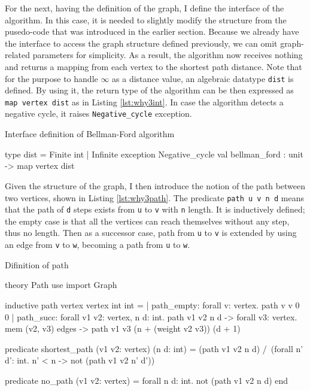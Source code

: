 \documentclass[a4paper,12pt]{article}
\begin{document}
For the next, having the definition of the graph, I define the
interface of the algorithm. In this case, it is needed to slightly
modify the structure from the pusedo-code that was introduced in the
earlier section. Because we already have the interface to access the
graph structure defined previously, we can omit graph-related
parameters for simplicity. As a result, the algorithm now receives
nothing and returns a mapping from each vertex to the shortest path
distance. Note that for the purpose to handle $\infty$ as a distance
value, an algebraic datatype \texttt{dist} is defined. By using it,
the return type of the algorithm can be then expressed as \texttt{map
  vertex dist} as in Listing \ref{lst:why3int}. In case the algorithm
detects a negative cycle, it raises \texttt{Negative\_cycle}
exception.

\begin{algorithm}
\caption{Interface definition of Bellman-Ford algorithm}\label{lst:why3int}
\begin{why3}
type dist = Finite int | Infinite
exception Negative_cycle
val bellman_ford : unit -> map vertex dist
\end{why3}
\end{algorithm}

Given the structure of the graph, I then introduce the notion of the
path between two vertices, shown in Listing \ref{lst:why3path}. The
predicate \texttt{path u v n d} means that the path of \texttt{d}
steps exists from \texttt{u} to \texttt{v} with \texttt{n} length. It
is inductively defined; the empty case is that all the vertices can
reach themselves without any step, thus no length. Then as a successor
case, path from \texttt{u} to \texttt{v} is extended by using an edge
from \texttt{v} to \texttt{w}, becoming a path from \texttt{u} to
\texttt{w}.

\begin{algorithm}
\caption{Difinition of path}\label{lst:why3path}
\begin{why3}
theory Path
  use import Graph

  inductive path vertex vertex int int =
    | path_empty:
        forall v: vertex. path v v 0 0
    | path_succ:
        forall v1 v2: vertex, n d: int. path v1 v2 n d ->
        forall v3: vertex. mem (v2, v3) edges ->
        path v1 v3 (n + (weight v2 v3)) (d + 1)

  predicate shortest_path (v1 v2: vertex) (n d: int) =
    (path v1 v2 n d) /\
    (forall n' d': int. n' < n -> not (path v1 v2 n' d'))

  predicate no_path (v1 v2: vertex) =
    forall n d: int. not (path v1 v2 n d)
end
\end{why3}
\end{algorithm}
\end{document}
